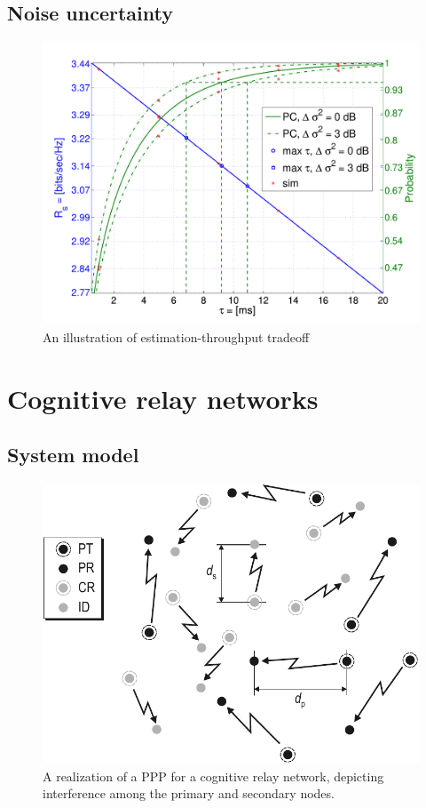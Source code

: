 \subsection{Noise uncertainty}
\begin{figure}[!t]
\makeatletter
        \includegraphics[trim=0.6cm 0.4cm 0.2cm 1.2cm,clip=true,width=\columnwidth]{../kapitel04/figures/fig_thr_est_time_tradeoff_AWGN}
\caption{An illustration of estimation-throughput tradeoff}
\label{fig:ID_OC}
\end{figure}



\section{Cognitive relay networks}
\subsection{System model}

\begin{figure}[!t]
        \centering
        \includegraphics[trim=0.0cm 0.0cm 0.0cm 0.0cm,clip=true,width= 0.85 \columnwidth]{../kapitel04/figures/SGeometry}
        \caption{A realization of a PPP for a cognitive relay network, depicting interference among the primary and secondary nodes.} 
        \label{fig:Int_Sc}
\end{figure}
\cite{Kaushik_PIMRC}

